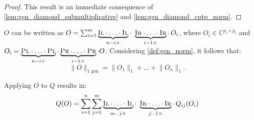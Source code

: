   \begin{proof}
    This result is an immediate consequence of \autoref{lem:gen_diamond_submultiplicative} and \autoref{lem:gen_diamond_cptp_norm}. 
  \end{proof}
  
















%
%
%
%
%
%
%
%
%
%
%
%
%


%
%
%
%
%
%
%
%
%
%
%
%
%




$O$ can be written as  $O = \sum_{i=1}^{m} \underbrace{\textsc{Il} \cdot \ldots \cdot \textsc{Il}}_{n-i \times} \cdot   \underbrace{\textsc{Ir} \cdot \ldots \cdot \textsc{Ir}}_{i-1 \times} \cdot \hspace{2pt} O_{i} 
$, where  $O_{i} \in \mathbb{C}^{p_i \times p_i}$ and $O_i =  \underbrace{\textsc{Pl} \cdot \ldots \cdot \textsc{Pl}}_{n-i \times} \cdot \underbrace{\textsc{Pr} \cdot \ldots \cdot \textsc{Pr}}_{i-1 \times} \cdot O $. Considering \autoref{def:gen_norm}, it follows that: 
\begin{equation}
  \lVert O  \rVert_{1 \text{ gen}} =   \lVert O_1 \rVert_{1} + \ldots + \lVert O_n \rVert_{1}.
\end{equation}

Applying $O$ to $Q$ results in:
\begin{equation}
\begin{split}
Q(O) & = \sum_{i=1}^{n} \sum_{j=1}^{m} \underbrace{\textsc{Il} \cdot \ldots \cdot \textsc{Il}}_{m-j \times} \cdot   \underbrace{\textsc{Ir} \cdot \ldots \cdot \textsc{Ir}}_{j-1 \times} \cdot \hspace{2pt} Q_{ij} (O_{i}) \\
\end{split}
\end{equation}

